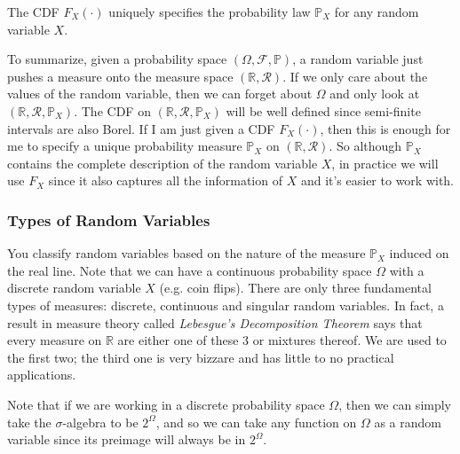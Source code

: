 \documentclass{article}
\begin{document}
      \begin{theorem}
        The CDF $F_X (\cdot)$ uniquely specifies the probability law $\mathbb{P}_X$ for any random variable $X$. 
      \end{theorem}

      To summarize, given a probability space $(\Omega, \mathcal{F}, \mathbb{P})$, a random variable just pushes a measure onto the measure space $(\mathbb{R}, \mathcal{R})$. If we only care about the values of the random variable, then we can forget about $\Omega$ and only look at $(\mathbb{R}, \mathcal{R}, \mathbb{P}_X)$. The CDF on $(\mathbb{R}, \mathcal{R}, \mathbb{P}_X)$ will be well defined since semi-finite intervals are also Borel. If I am just given a CDF $F_X (\cdot)$, then this is enough for me to specify a unique probability measure $\mathbb{P}_X$ on $(\mathbb{R}, \mathcal{R})$. So although $\mathbb{P}_X$ contains the complete description of the random variable $X$, in practice we will use $F_X$ since it also captures all the information of $X$ and it's easier to work with. 

    \subsubsection{Types of Random Variables}

      You classify random variables based on the nature of the measure $\mathbb{P}_X$ induced on the real line. Note that we can have a continuous probability space $\Omega$ with a discrete random variable $X$ (e.g. coin flips). There are only three fundamental types of measures: discrete, continuous and singular random variables. In fact, a result in measure theory called \textit{Lebesgue's Decomposition Theorem} says that every measure on $\mathbb{R}$ are either one of these 3 or mixtures thereof. We are used to the first two; the third one is very bizzare and has little to no practical applications. 

      Note that if we are working in a discrete probability space $\Omega$, then we can simply take the $\sigma$-algebra to be $2^\Omega$, and so we can take any function on $\Omega$ as a random variable since its preimage will always be in $2^\Omega$. 
\end{document}
